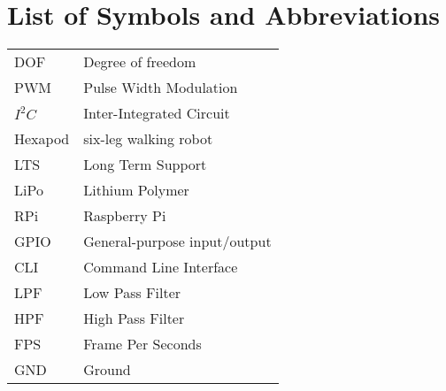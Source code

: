 


\usepackage[colorinlistoftodos]{todonotes}


\pagestyle{empty}



\frontmatter %
\pagestyle{fancy}



\tableofcontents
\listoffigures
\listoftables
\listofalgorithms


\chapter*{List of Symbols and Abbreviations}

\begin{tabular}{l l}
	DOF      & Degree of freedom    \\
	PWM     & Pulse Width Modulation       \\
	$I^2C$  & Inter-Integrated Circuit     \\
	Hexapod & six-leg walking robot\\
	LTS     & Long Term Support     \\
	LiPo     & Lithium Polymer      \\
	RPi      & Raspberry Pi \\
	GPIO   & General-purpose input/output \\
	CLI    & Command Line Interface  \\
	LPF     & Low Pass Filter      \\
	HPF    & High Pass Filter     \\
	FPS     & Frame Per Seconds    \\
	GND   & Ground
\end{tabular} 


